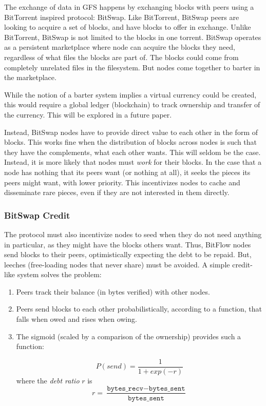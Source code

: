 \documentclass{sig-alternate}
\begin{document}
The exchange of data in GFS happens by exchanging blocks with peers using a
BitTorrent inspired protocol: BitSwap. Like BitTorrent, BitSwap peers are
looking to acquire a set of blocks, and have blocks to offer in exchange.
Unlike BitTorrent, BitSwap is not limited to the blocks in one torrent.
BitSwap operates as a persistent marketplace where node can acquire the
blocks they need, regardless of what files the blocks are part of. The
blocks could come from completely unrelated files in the filesystem.
But nodes come together to barter in the marketplace.

While the notion of a barter system implies a virtual currency could be
created, this would require a global ledger (blockchain) to track ownership
and transfer of the currency. This will be explored in a future paper.

Instead, BitSwap nodes have to provide direct value to each other
in the form of blocks. This works fine when the distribution of blocks across
nodes is such that they have the complements, what each other wants. This will
seldom be the case. Instead, it is more likely that nodes must \textit{work}
for their blocks. In the case that a node has nothing that its peers want (or
nothing at all), it seeks the pieces its peers might want, with lower
priority. This incentivizes nodes to cache and disseminate rare pieces, even
if they are not interested in them directly.

\subsubsection{BitSwap Credit}

The protocol must also incentivize nodes to seed when they do not need
anything in particular, as they might have the blocks others want. Thus,
BitFlow nodes send blocks to their peers, optimistically expecting the debt to
be repaid. But, leeches (free-loading nodes that never share) must be avoided. A simple credit-like system solves the problem:

\begin{enumerate}
  \item Peers track their balance (in bytes verified) with other nodes.
  \item Peers send blocks to each other probabilistically, according to
        a function, that falls when owed and rises when owing.
  \item The sigmoid (scaled by a comparison of the ownership) provides such a
        function:

  \[ P(send) = \dfrac{1}{1 + exp(-r)} \]
  where the \textit{debt ratio} $ r $ is
  \[ r = \dfrac{\texttt{bytes\_recv} - \texttt{bytes\_sent}}{\texttt{bytes\_sent}} \]
\end{enumerate}
\end{document}
